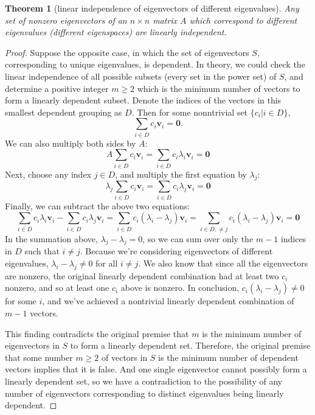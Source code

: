 \documentclass[draft,12pt]{report}
\newtheorem{theorem}{Theorem}
\renewcommand{\vec}[1]{\mathbf{#1}}
\begin{document}
\begin{theorem}[linear independence of eigenvectors of different eigenvalues]
    Any set of nonzero eigenvectors of an $n \times n$ matrix $A$ which correspond to different eigenvalues (different eigenspaces) are linearly independent.
\end{theorem}
\begin{proof}
    Suppose the opposite case, in which the set of eigenvectors $S$, corresponding to unique eigenvalues, is dependent. In theory, we could check the linear independence of all possible subsets (every set in the power set) of $S$, and determine a positive integer $m \geq 2$ which is the minimum number of vectors to form a linearly dependent subset. Denote the indices of the vectors in this smallest dependent grouping as $D$. Then for some nonntrivial set $\{ c_i | i \in D \}$,
    \[ \sum_{i \in D} c_i \vec{v}_i = \vec{0}. \]
    We can also multiply both sides by $A$:
    \[ A\sum_{i \in D} c_i \vec{v}_i = \sum_{i \in D} c_i \lambda_i \vec{v}_i = \vec{0} \]
    Next, choose any index $j \in D$, and multiply the first equation by $\lambda_j$:
    \[ \lambda_j\sum_{i \in D} c_i \vec{v}_i = \sum_{i \in D} c_i \lambda_j \vec{v}_i = \vec{0} \]
    Finally, we can subtract the above two equations:
    \[ \sum_{i \in D} c_i \lambda_i \vec{v}_i - \sum_{i \in D} c_i \lambda_j \vec{v}_i = \sum_{i \in D} c_i (\lambda_i - \lambda_j) \vec{v}_i = \sum_{i \in D, \neq j} c_i (\lambda_i - \lambda_j) \vec{v}_i = \vec{0} \]
    In the summation above, $\lambda_j - \lambda_j = 0$, so we can sum over only the $m - 1$ indices in $D$ such that $i \neq j$. Because we're considering eigenvectors of different eigenvalues, $\lambda_i - \lambda_j \neq 0$ for all $i \neq j$. We also know that since all the eigenvectors are nonzero, the original linearly dependent combination had at least two $c_i$ nonzero, and so at least one $c_i$ above is nonzero. In conclusion, $c_i(\lambda_i - \lambda_j) \neq 0$ for some $i$, and we've achieved a nontrivial linearly dependent combination of $m - 1$ vectors.
    
    This finding contradicts the original premise that $m$ is the minimum number of eigenvectors in $S$ to form a linearly dependent set. Therefore, the original premise that some number $m \geq 2$ of vectors in $S$ is the minimum number of dependent vectors implies that it is false. And one single eigenvector cannot possibly form a linearly dependent set, so we have a contradiction to the possibility of any number of eigenvectors corresponding to distinct eigenvalues being linearly dependent.
\end{proof}
\end{document}
